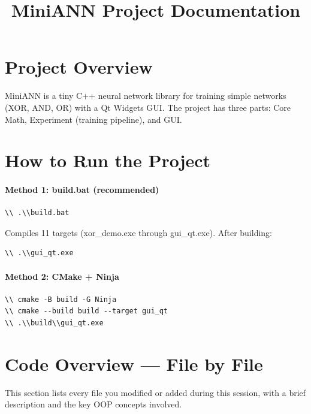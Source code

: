 \documentclass[12pt]{article}
\title{MiniANN Project Documentation}
\author{}
\date{}
\begin{document}
\maketitle

\section{Project Overview}
MiniANN is a tiny C++ neural network library for training simple networks (XOR, AND, OR) with a Qt Widgets GUI. The project has three parts: Core Math, Experiment (training pipeline), and GUI.

\section{How to Run the Project}
\paragraph{Method 1: build.bat (recommended)}
\begin{verbatim}
\\ .\\build.bat
\end{verbatim}
Compiles 11 targets (xor_demo.exe through gui_qt.exe). After building:
\begin{verbatim}
\\ .\\gui_qt.exe
\end{verbatim}

\paragraph{Method 2: CMake + Ninja}
\begin{verbatim}
\\ cmake -B build -G Ninja
\\ cmake --build build --target gui_qt
\\ .\\build\\gui_qt.exe
\end{verbatim}

\section{Code Overview — File by File}
This section lists every file you modified or added during this session, with a brief description and the key OOP concepts involved.
\end{document}
